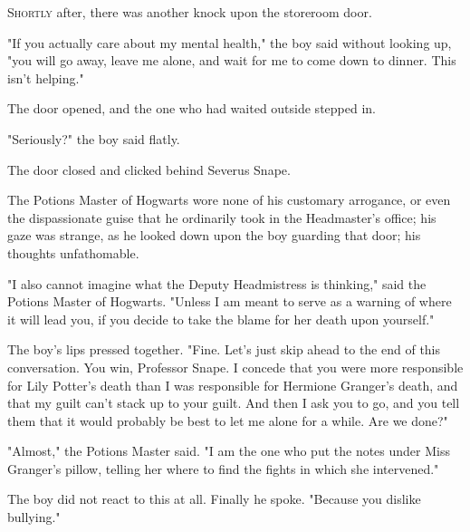 

\lettrine{S}{hortly} after, there was another knock upon the storeroom door.

\quad\quad
"If you actually care about my mental health," the boy said without looking up,
"you will go away, leave me alone, and wait for me to come down to dinner. This
isn't helping."

The door opened, and the one who had waited outside stepped in.

"Seriously?" the boy said flatly.

The door closed and clicked behind Severus Snape.

The Potions Master of Hogwarts wore none of his customary arrogance, or even
the dispassionate guise that he ordinarily took in the Headmaster's office; his
gaze was strange, as he looked down upon the boy guarding that door; his
thoughts unfathomable.

"I also cannot imagine what the Deputy Headmistress is thinking," said the
Potions Master of Hogwarts. "Unless I am meant to serve as a warning of where
it will lead you, if you decide to take the blame for her death upon yourself."

The boy's lips pressed together. "Fine. Let's just skip ahead to the end of
this conversation. You win, Professor Snape. I concede that you were more
responsible for Lily Potter's death than I was responsible for Hermione
Granger's death, and that my guilt can't stack up to your guilt. And then I ask
you to go, and you tell them that it would probably be best to let me alone for
a while. Are we done?"

"Almost," the Potions Master said. "I am the one who put the notes under Miss
Granger's pillow, telling her where to find the fights in which she intervened."

The boy did not react to this at all. Finally he spoke. "Because you dislike
bullying."

